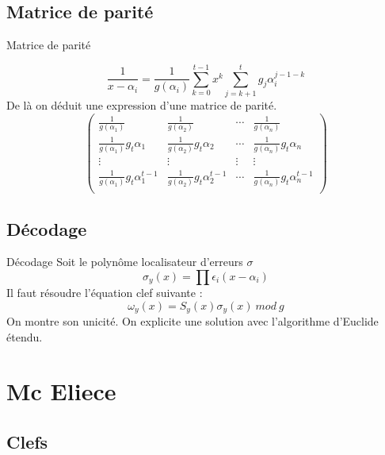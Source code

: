 \documentclass{beamer}
\begin{document}
		\subsection{Matrice de parité}

			\begin{frame}{Matrice de parité}

				$$
					\frac{1}{{x-\alpha_{i}}} = \frac{1}{g(\alpha_{i})} \sum_{k=0}^{t-1} x^{k}\sum_{j=k+1}^{t} g_{j}\alpha_{i}^{j-1-k}
				$$
				De là on déduit une expression d'une matrice de parité.
				$$
				\begin{pmatrix}
					\frac{1}{g(\alpha_{1})} &  \frac{1}{g(\alpha_{2})} & \cdots &  \frac{1}{g(\alpha_{n})} \\
					\frac{1}{g(\alpha_{1})}g_{t}\alpha_{1} &  \frac{1}{g(\alpha_{2})}g_{t}\alpha_{2} & \cdots &  \frac{1}{g(\alpha_{n})}g_{t}\alpha_{n}\\
					\vdots & \vdots & \vdots & \vdots\\
					\frac{1}{g(\alpha_{1})}g_{t}\alpha_{1}^{t-1} &  \frac{1}{g(\alpha_{2})}g_{t}\alpha_{2}^{t-1} & \cdots &  \frac{1}{g(\alpha_{n})}g_{t}\alpha_{n}^{t-1} \\
				\end{pmatrix}
				$$
						
			\end{frame}

		\subsection{Décodage}

			\begin{frame}{Décodage}
				Soit le polynôme localisateur d'erreurs $\sigma$
				$$
					\sigma_{y}(x) = \prod \epsilon_{i}(x-\alpha_{i})
				$$
				Il faut résoudre l'équation clef suivante :
				$$
					\omega_{y}(x) = S_{y}(x) \sigma_{y}(x) \ mod \ g
				$$
				On montre son unicité.
				On explicite une solution avec l'algorithme d'Euclide étendu.
			\end{frame}

	\section{Mc Eliece}

		\subsection{Clefs}
\end{document}
